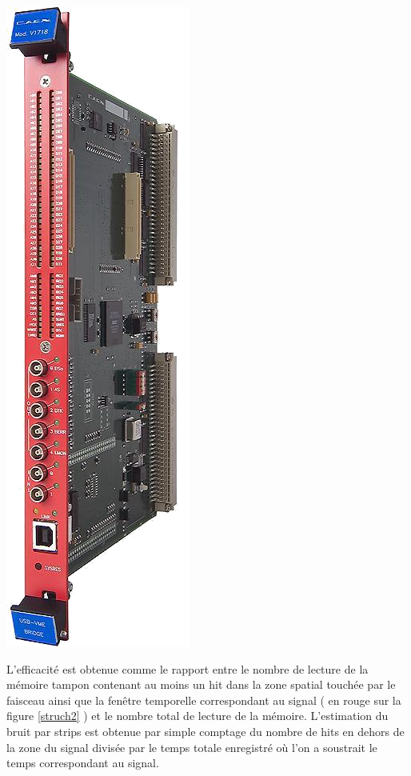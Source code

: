 \marginpar
{
	\centering
	\includegraphics[width=0.5\marginparwidth]{GLA/VMEUSB.png}
	\label{VME}
}

L'efficacité est obtenue comme le rapport entre le nombre de lecture de la mémoire tampon contenant au moins un hit dans la zone spatial touchée par le faisceau ainsi que la fenêtre temporelle correspondant au signal ( en rouge sur la figure \ref{struch2} ) et le nombre total de lecture de la mémoire. L'estimation du bruit par strips est obtenue par simple comptage du nombre de hits en dehors de la zone du signal divisée par le temps totale enregistré où l'on a soustrait le temps correspondant au signal.

